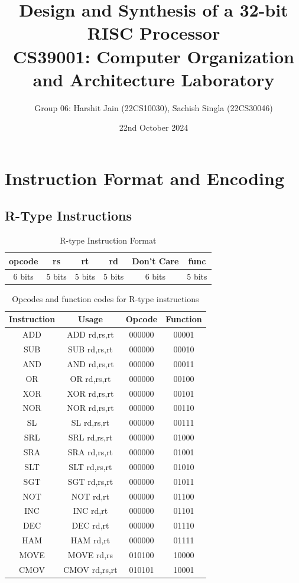 \documentclass{article}
\title{\textbf{Design and Synthesis of a 32-bit RISC Processor}\\[0.5em]
\large CS39001: Computer Organization and Architecture Laboratory}
\author{Group 06: Harshit Jain (22CS10030), Sachish Singla (22CS30046)}
\date{22nd October 2024}
\begin{document}
\maketitle

\tableofcontents
\newpage

\section{ Instruction Format and Encoding}

\subsection{R-Type Instructions}
\begin{table}[H]
    \centering
    \begin{tabular}{|c|c|c|c|c|c|}
        \hline
        \textbf{opcode} & \textbf{rs} & \textbf{rt} & \textbf{rd} & \textbf{Don't Care} & \textbf{func} \\
        \hline
        6 bits & 5 bits & 5 bits & 5 bits & 6 bits & 5 bits \\
        \hline
    \end{tabular}
    \caption{R-type Instruction Format}
\end{table}

\begin{table}[H]
    \centering
    \begin{tabular}{|c|c|c|c|}
        \hline
        \textbf{Instruction} & \textbf{Usage} & \textbf{Opcode} & \textbf{Function} \\
        \hline
        ADD & ADD rd,rs,rt & 000000 & 00001 \\
        SUB & SUB rd,rs,rt & 000000 & 00010 \\
        AND & AND rd,rs,rt & 000000 & 00011 \\
        OR  & OR rd,rs,rt & 000000 & 00100 \\
        XOR & XOR rd,rs,rt & 000000 & 00101 \\
        NOR & NOR rd,rs,rt & 000000 & 00110 \\
        SL  & SL rd,rs,rt  & 000000 & 00111 \\
        SRL & SRL rd,rs,rt & 000000 & 01000 \\
        SRA & SRA rd,rs,rt & 000000 & 01001 \\
        SLT & SLT rd,rs,rt & 000000 & 01010 \\
        SGT & SGT rd,rs,rt & 000000 & 01011 \\
        NOT & NOT rd,rt & 000000 & 01100 \\
        INC & INC rd,rt & 000000 & 01101 \\
        DEC & DEC rd,rt & 000000 & 01110 \\
        HAM & HAM rd,rt & 000000 & 01111 \\
        MOVE & MOVE rd,rs & 010100 & 10000 \\
        CMOV & CMOV rd,rs,rt & 010101 & 10001 \\
        \hline
    \end{tabular}
    \caption{Opcodes and function codes for R-type instructions}
\end{table}
\end{document}
